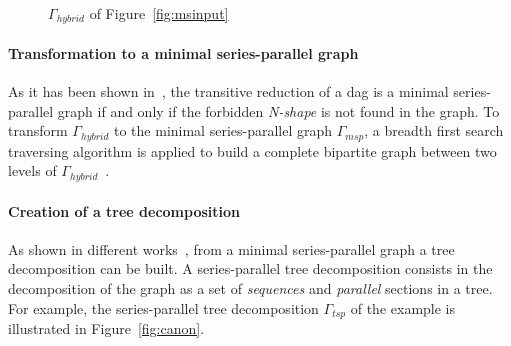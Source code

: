 \begin{figure}[h!]
\begin{center}
\caption{$\Gamma_{hybrid}$ of Figure~\ref{fig:msinput}}
\label{fig:hyb}
\end{center}
\end{figure}


\paragraph{Transformation to a minimal series-parallel graph} As it has been shown in~\cite{Valdes:1979:RSP:800135.804393}, the transitive reduction of a dag is a minimal series-parallel graph if and only if the forbidden \emph{N-shape} is not found in the graph. To transform $\Gamma_{hybrid}$ to the minimal series-parallel graph $\Gamma_{msp}$, a breadth first search traversing algorithm is applied to build a complete bipartite graph between two levels of $\Gamma_{hybrid}$~\cite{Mitchell:2004:CMV:1082101.1082117}.

\paragraph{Creation of a tree decomposition} As shown in different works~\cite{Valdes:1979:RSP:800135.804393,Schoenmakers95anew}, from a minimal series-parallel graph a tree decomposition can be built. A series-parallel tree decomposition consists in the decomposition of the graph as a set of \emph{sequences} and \emph{parallel} sections in a tree. For example, the series-parallel tree decomposition $\Gamma_{tsp}$ of the example is illustrated in Figure~\ref{fig:canon}.

